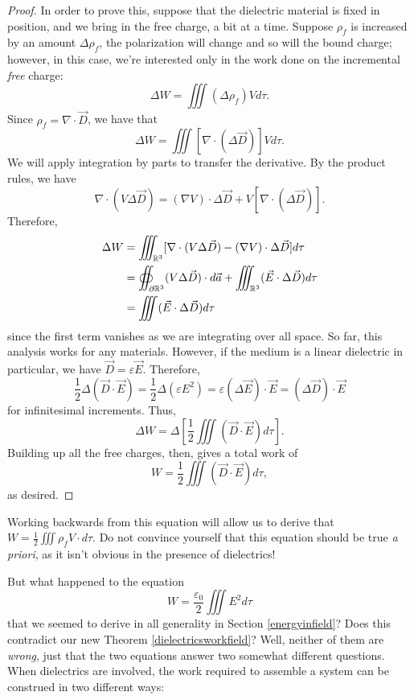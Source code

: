 \begin{proof}
In order to prove this, suppose that the dielectric material is fixed in position, and we bring in the free charge, a bit at a time. Suppose $\rho_f$ is increased by an amount $\Delta \rho_f$, the polarization will change and so will the bound charge; however, in this case, we're interested only in the work done on the incremental \textit{free} charge:
\[\Delta W=\iiint (\Delta\rho_f)V d\tau.\]
Since $\rho_f=\nabla\cdot \vec{D}$, we have that
\[\Delta W=\iiint [\nabla\cdot (\Delta \vec{D})]Vd\tau.\]
We will apply integration by parts to transfer the derivative. By the product rules, we have
\[\nabla\cdot (V\Delta \vec{D})=(\nabla V)\cdot \Delta\vec{D}+V[\nabla\cdot(\Delta \vec{D})].\]
Therefore,
\begin{align*}
    \Delta W&=\iiint_{\mathbb R^3} [\nabla\cdot (V\Delta \vec{D})-(\nabla V)\cdot \Delta \vec{D}]d\tau\\
    &=\oiint_{\partial\mathbb R^3} (V\Delta \vec{D})\cdot d\vec{a}+\iiint_{\mathbb R^3}(\vec{E}\cdot \Delta\vec{D})d\tau\\
    &=\iiint (\vec{E}\cdot \Delta\vec{D})d\tau
\end{align*}
since the first term vanishes as we are integrating over all space. So far, this analysis works for any materials. However, if the medium is a linear dielectric in particular, we have $\vec{D}=\varepsilon \vec{E}$. Therefore,
\[\frac{1}{2}\Delta(\vec{D}\cdot\vec{E})=\frac{1}{2}\Delta(\varepsilon E^2)=\varepsilon (\Delta \vec{E})\cdot \vec{E}=(\Delta \vec{D})\cdot \vec{E}\]
for infinitesimal increments. Thus,
\[\Delta W=\Delta\left[\frac{1}{2}\iiint (\vec{D}\cdot\vec{E})d\tau\right].\]
Building up all the free charges, then, gives a total work of
\[W=\frac{1}{2}\iiint (\vec{D}\cdot\vec{E})d\tau,\]
as desired.
\end{proof}

\begin{remark}
Working backwards from this equation will allow us to derive that $W=\frac{1}{2}\iiint \rho_fV\cdot d\tau$. Do not convince yourself that this equation should be true \textit{a priori}, as it isn't obvious in the presence of dielectrics!
\end{remark}

But what happened to the equation 
\[W=\frac{\varepsilon_0}{2}\iiint E^2 d\tau\]
that we seemed to derive in all generality in Section \ref{energyinfield}? Does this contradict our new Theorem \ref{dielectricsworkfield}? Well, neither of them are \textit{wrong}, just that the two equations answer two somewhat different questions. When dielectrics are involved, the work required to assemble a system can be construed in two different ways:

